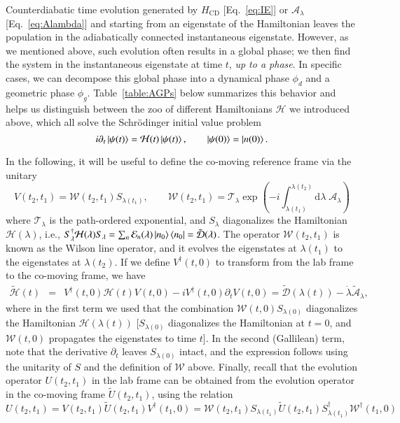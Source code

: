 Counterdiabatic time evolution generated by $H_\text{CD}$ [Eq.~\eqref{eq:IE}] or $\mathcal{A}_\lambda$ [Eq.~\eqref{eq:Alambda}] and starting from an eigenstate of the Hamiltonian leaves the population in the adiabatically connected instantaneous eigenstate. However, as we mentioned above, such evolution often results in a global phase; we then find the system in the instantaneous eigenstate at time $t$, \textit{up to a phase}. In specific cases, we can decompose this global phase into a dynamical phase $\phi_d$ and a geometric phase $\phi_g$.
Table~\ref{table:AGPs} below summarizes this behavior and helps us distinguish between the zoo of different Hamiltonians $\mathcal{H}$ we introduced above, which all solve the Schr\"odinger initial value problem
\begin{equation}
    i\partial_t\ket{\psi(t)} = \mathcal{H}(t)\ket{\psi(t)},\qquad
    \ket{\psi(0)}=\ket{n(0)}.
\end{equation}

In the following, it will be useful to define the co-moving reference frame via the unitary
\begin{equation}
    V(t_2,t_1) = \mathcal{W}(t_2, t_1)S_{\lambda(t_1)},\qquad \mathcal{W}(t_2, t_1)=\mathcal{T}_\lambda\exp\left(-i \int^{\lambda(t_2)}_{\lambda(t_1)}\mathrm d \lambda\;\mathcal{A}_{\lambda} \right)
\end{equation}
where $\mathcal{T}_\lambda$ is the path-ordered exponential, and $S_\lambda$ diagonalizes the Hamiltonian $\mathcal{H}(\lambda)$, i.e.,
$S^\dagger_{\lambda} \mathcal{H}(\lambda) S_\lambda = \sum_n \mathcal{E}_n(\lambda) \ket{n_0}\bra{n_0} = \tilde{\mathcal{D}}(\lambda)$. The operator $\mathcal{W}(t_2, t_1)$ is known as the Wilson line operator, and it evolves the eigenstates at $\lambda(t_1)$ to the eigenstates at $\lambda(t_2)$. If we define $V^\dagger(t,0)$ to transform from the lab frame to the co-moving frame, we have
\begin{eqnarray}
    \tilde{\mathcal{H}}(t) &=& V^\dagger(t,0)\mathcal{H}(t)V(t,0) - i V^\dagger(t,0)\partial_t V(t,0)  = \tilde{\mathcal{D}}(\lambda(t)) - \dot\lambda \tilde{\mathcal{A}}_\lambda,
\end{eqnarray}
where in the first term we used that the combination $\mathcal{W}(t,0)S_{\lambda(0)}$ diagonalizes the Hamiltonian $\mathcal{H}(\lambda(t))$ [$S_{\lambda(0)}$ diagonalizes the Hamiltonian at $t=0$, and $\mathcal{W}(t,0)$ propagates the eigenstates to time $t$]. In the second (Gallilean) term, note that the derivative $\partial_t$ leaves $S_{\lambda(0)}$ intact, and the expression follows using the unitarity of $S$ and the definition of $\mathcal{W}$ above.
Finally, recall that the evolution operator $U(t_2,t_1)$ in the lab frame can be obtained from the evolution operator in the co-moving frame $\tilde U(t_2,t_1)$, using the relation
\begin{equation}
\label{eq:lab-rot}
    U(t_2,t_1) = V(t_2,t_1) \tilde U(t_2,t_1) V^\dagger(t_1,0) = \mathcal{W}(t_2,t_1) S_{\lambda(t_1)} \tilde U(t_2,t_1) S^\dagger_{\lambda(t_1)} \mathcal{W}^\dagger(t_1,0)
\end{equation}


